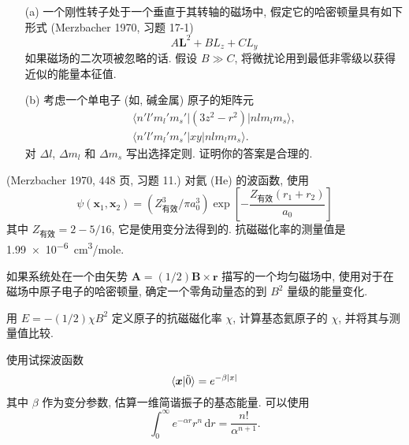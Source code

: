 \documentclass{assignment}
\begin{document}
\begin{prob}[课本习题 5.17]
    \begin{itemize}
        \item[(a)] 一个刚性转子处于一个垂直于其转轴的磁场中, 假定它的哈密顿量具有如下形式 (Merzbacher 1970, 习题 17-1)
        \[
            A\bm{L}^2+BL_z+CL_y
        \]
        如果磁场的二次项被忽略的话. 假设 $B\gg C$, 将微扰论用到最低非零级以获得近似的能量本征值.
        \item[(b)] 考虑一个单电子 (如, 碱金属) 原子的矩阵元
        \begin{gather*}
            \langle n'l'm_l'm_s'\rvert(3z^2-r^2)\lvert nlm_lm_s\rangle,\\
            \langle n'l'm_l'm_s'\rvert xy\lvert nlm_lm_s\rangle.
        \end{gather*}
        对 $\Delta l$, $\Delta m_l$ 和 $\Delta m_s$ 写出选择定则. 证明你的答案是合理的.
    \end{itemize}
\end{prob}
\begin{sol}
    \begin{itemize}
        
    \end{itemize}
\end{sol}

\begin{prob}[课本习题 5.19]
    (Merzbacher 1970, 448 页, 习题 11.) 对氦 (He) 的波函数, 使用
    \[
        \psi(\bm{x}_1,\bm{x}_2)=(Z_{\text{有效}}^3/\pi a_0^3)\exp\left[-\frac{Z_{\text{有效}}(r_1+r_2)}{a_0}\right]
    \]
    其中 $Z_{\text{有效}}=2-5/16$, 它是使用变分法得到的. 抗磁磁化率的测量值是 \SI{1.99e-6}{cm^3/mole}.

    如果系统处在一个由矢势 $\bm{A}=(1/2)\bm{B}\times\bm{r}$ 描写的一个均匀磁场中, 使用对于在磁场中原子电子的哈密顿量, 确定一个零角动量态的到 $B^2$ 量级的能量变化.

    用 $E=-(1/2)\chi B^2$ 定义原子的抗磁磁化率 $\chi$, 计算基态氦原子的 $\chi$, 并将其与测量值比较.
\end{prob}
\begin{sol}
    
\end{sol}

\begin{prob}[课本习题 5.20]
    使用试探波函数
    \[
        \langle\bm{x}\vert\tilde{0}\rangle=e^{-\beta\left\lvert x\right\rvert}
    \]
    其中 $\beta$ 作为变分参数, 估算一维简谐振子的基态能量. 可以使用
    \[
        \int_0^{\infty}e^{-\alpha r}r^n\,\mathrm{d}r=\frac{n!}{\alpha^{n+1}}.
    \]
\end{prob}
\begin{sol}
    
\end{sol}
\end{document}
